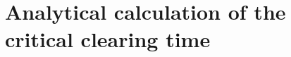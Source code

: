 
\newpage
\section{Analytical calculation of the critical clearing time}
\label{sec:analytical-method}

